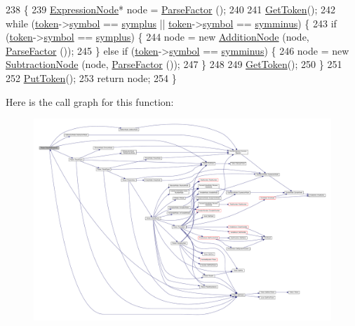 \begin{DoxyCode}
238 \{
239     \hyperlink{classExpressionNode}{ExpressionNode}* node = \hyperlink{classParser_a70c674c7b40f7a0ab1df0523c4c8c530}{ParseFactor} ();
240 
241     \hyperlink{classParser_a415a103e66558b4d366d9a1420561fe3}{GetToken}();
242     \textcolor{keywordflow}{while} (\hyperlink{classParser_a467028559d31c5b33f16ca8be56715cc}{token}->\hyperlink{structToken_aa671eaaae5632c5277e89a090d864820}{symbol} == \hyperlink{lex_8h_a7feef761cd73fac6e25b8bb80d2c4e54a8b82e1abf6424d09e2381b95f3bd5e00}{symplus} || \hyperlink{classParser_a467028559d31c5b33f16ca8be56715cc}{token}->\hyperlink{structToken_aa671eaaae5632c5277e89a090d864820}{symbol} == 
      \hyperlink{lex_8h_a7feef761cd73fac6e25b8bb80d2c4e54ac9d48bb4c6d7713a366e601a9b95c2c4}{symminus}) \{
243         \textcolor{keywordflow}{if} (\hyperlink{classParser_a467028559d31c5b33f16ca8be56715cc}{token}->\hyperlink{structToken_aa671eaaae5632c5277e89a090d864820}{symbol} == \hyperlink{lex_8h_a7feef761cd73fac6e25b8bb80d2c4e54a8b82e1abf6424d09e2381b95f3bd5e00}{symplus}) \{
244             node = \textcolor{keyword}{new} \hyperlink{classAdditionNode}{AdditionNode} (node, \hyperlink{classParser_a70c674c7b40f7a0ab1df0523c4c8c530}{ParseFactor} ());
245         \} \textcolor{keywordflow}{else} \textcolor{keywordflow}{if} (\hyperlink{classParser_a467028559d31c5b33f16ca8be56715cc}{token}->\hyperlink{structToken_aa671eaaae5632c5277e89a090d864820}{symbol} == \hyperlink{lex_8h_a7feef761cd73fac6e25b8bb80d2c4e54ac9d48bb4c6d7713a366e601a9b95c2c4}{symminus}) \{
246             node = \textcolor{keyword}{new} \hyperlink{classSubtractionNode}{SubtractionNode} (node, \hyperlink{classParser_a70c674c7b40f7a0ab1df0523c4c8c530}{ParseFactor} ());
247         \}
248 
249         \hyperlink{classParser_a415a103e66558b4d366d9a1420561fe3}{GetToken}();
250     \}
251 
252     \hyperlink{classParser_adb5c3a188b36f7ecb198ae30f06338b3}{PutToken}();
253     \textcolor{keywordflow}{return} node;
254 \}
\end{DoxyCode}


Here is the call graph for this function\+:\nopagebreak
\begin{figure}[H]
\begin{center}
\leavevmode
\includegraphics[width=350pt]{classParser_a47ba11ddd167c1b0b5cf1d2fd1cf1ccd_cgraph}
\end{center}
\end{figure}




